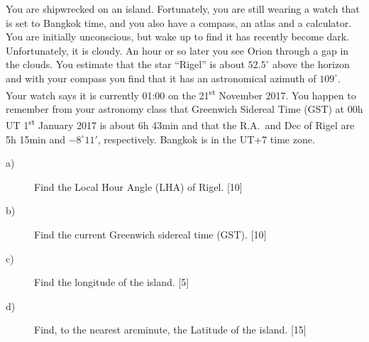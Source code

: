 You are shipwrecked on an island. Fortunately, you are still wearing a watch
that is set to Bangkok time, and you also have a compass, an atlas and a
calculator. You are initially unconscious, but wake up to find it has recently
become dark. Unfortunately, it is cloudy. An hour or so later you see Orion
through a gap in the clouds. You estimate that the star ``Rigel'' is about
$52.5^\circ$ above the horizon and with your compass you find that it has an
astronomical azimuth of $109^\circ$. Your watch says it is currently 01:00 on
the 21\textsuperscript{st} November 2017. You happen to remember from your
astronomy class that Greenwich Sidereal Time (GST) at 00h UT
1\textsuperscript{st} January 2017 is about 6h 43min and that the R.A.\ and Dec
of Rigel are 5h 15min and $-8^\circ 11'$, respectively. Bangkok is in the UT+7
time zone.

\begin{description}
\item[a)] Find the Local Hour Angle (LHA) of Rigel. \hfill[10]
\item[b)] Find the current Greenwich sidereal time (GST). \hfill[10]
\item[c)] Find the longitude of the island. \hfill[5]
\item[d)] Find, to the nearest arcminute, the Latitude of the island.
  \hfill[15]
\end{description}
